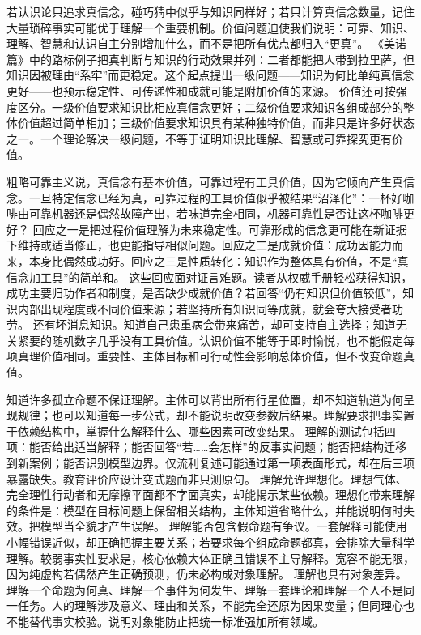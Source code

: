  若认识论只追求真信念，碰巧猜中似乎与知识同样好；若只计算真信念数量，记住大量琐碎事实可能优于理解一个重要机制。价值问题迫使我们说明：可靠、知识、理解、智慧和认识自主分别增加什么，而不是把所有优点都归入“更真”。 《美诺篇》中的路标例子把真判断与知识的行动效果并列：二者都能把人带到拉里萨，但知识因被理由“系牢”而更稳定。这个起点提出一级问题——知识为何比单纯真信念更好——也预示稳定性、可传递性和成就可能是附加价值的来源。 价值还可按强度区分。一级价值要求知识比相应真信念更好；二级价值要求知识各组成部分的整体价值超过简单相加；三级价值要求知识具有某种独特价值，而非只是许多好状态之一。一个理论解决一级问题，不等于证明知识比理解、智慧或可靠探究更有价值。

粗略可靠主义说，真信念有基本价值，可靠过程有工具价值，因为它倾向产生真信念。一旦特定信念已经为真，可靠过程的工具价值似乎被结果“沼泽化”：一杯好咖啡由可靠机器还是偶然故障产出，若味道完全相同，机器可靠性是否让这杯咖啡更好？ 回应之一是把过程价值理解为未来稳定性。可靠形成的信念更可能在新证据下维持或适当修正，也更能指导相似问题。回应之二是成就价值：成功因能力而来，本身比偶然成功好。回应之三是性质转化：知识作为整体具有价值，不是“真信念加工具”的简单和。 这些回应面对证言难题。读者从权威手册轻松获得知识，成功主要归功作者和制度，是否缺少成就价值？若回答“仍有知识但价值较低”，知识内部出现程度或不同价值来源；若坚持所有知识同等成就，就会夸大接受者功劳。 还有坏消息知识。知道自己患重病会带来痛苦，却可支持自主选择；知道无关紧要的随机数字几乎没有工具价值。认识价值不能等于即时愉悦，也不能假定每项真理价值相同。重要性、主体目标和可行动性会影响总体价值，但不改变命题真值。

知道许多孤立命题不保证理解。主体可以背出所有行星位置，却不知道轨道为何呈现规律；也可以知道每一步公式，却不能说明改变参数后结果。理解要求把事实置于依赖结构中，掌握什么解释什么、哪些因素可改变结果。 理解的测试包括四项：能否给出适当解释；能否回答“若……会怎样”的反事实问题；能否把结构迁移到新案例；能否识别模型边界。仅流利复述可能通过第一项表面形式，却在后三项暴露缺失。教育评价应设计变式题而非只测原句。 理解允许理想化。理想气体、完全理性行动者和无摩擦平面都不字面真实，却能揭示某些依赖。理想化带来理解的条件是：模型在目标问题上保留相关结构，主体知道省略什么，并能说明何时失效。把模型当全貌才产生误解。 理解能否包含假命题有争议。一套解释可能使用小幅错误近似，却正确把握主要关系；若要求每个组成命题都真，会排除大量科学理解。较弱事实性要求是，核心依赖大体正确且错误不主导解释。宽容不能无限，因为纯虚构若偶然产生正确预测，仍未必构成对象理解\parencite{grimm2006}。 理解也具有对象差异。理解一个命题为何真、理解一个事件为何发生、理解一套理论和理解一个人不是同一任务。人的理解涉及意义、理由和关系，不能完全还原为因果变量；但同理心也不能替代事实校验。说明对象能防止把统一标准强加所有领域。

